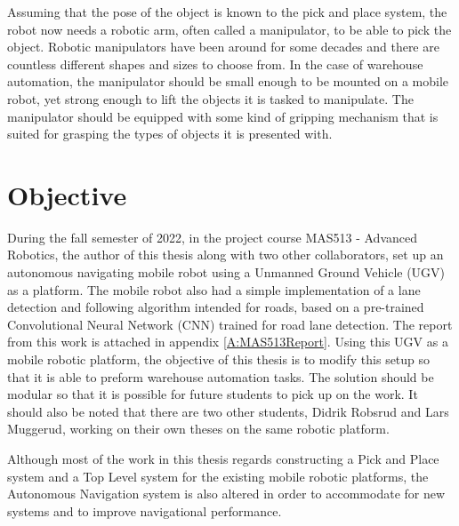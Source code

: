Assuming that the pose of the object is known to the pick and place system, the robot now needs a robotic arm, often called a manipulator, to be able to pick the object. Robotic manipulators have been around for some decades and there are countless different shapes and sizes to choose from. In the case of warehouse automation, the manipulator should be small enough to be mounted on a mobile robot, yet strong enough to lift the objects it is tasked to manipulate. The manipulator should be equipped with some kind of gripping mechanism that is suited for grasping the types of objects it is presented with.


\section{Objective} \label{sec:I:Objective}
During the fall semester of 2022, in the project course MAS513 - Advanced Robotics, the author of this thesis along with two other collaborators, set up an autonomous navigating mobile robot using a Unmanned Ground Vehicle (UGV) as a platform. The mobile robot also had a simple implementation of a lane detection and following algorithm intended for roads, based on a pre-trained Convolutional Neural Network (CNN) trained for road lane detection. The report from this work is attached in appendix \ref{A:MAS513Report}. Using this UGV as a mobile robotic platform, the objective of this thesis is to modify this setup so that it is able to preform warehouse automation tasks. The solution should be modular so that it is possible for future students to pick up on the work. It should also be noted that there are two other students, Didrik Robsrud and Lars Muggerud, working on their own theses on the same robotic platform.


Although most of the work in this thesis regards constructing a Pick and Place system and a Top Level system for the existing mobile robotic platforms, the Autonomous Navigation system is also altered in order to accommodate for new systems and to improve navigational performance.